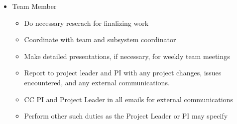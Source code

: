 \begin{itemize}
\item Team Member
	\begin{itemize}
	\item Do necessary reserach for finalizing work
	\item Coordinate with team and subsystem coordinator
	\item Make detailed presentations, if necessary, for weekly team meetings
	\item Report to project leader and PI with any project changes, issues encountered, and any external communications.
	\item CC PI and Project Leader in all emails for external communications
	\item Perform other such duties as the Project Leader or PI may specify
	\end{itemize}
\end{itemize}


